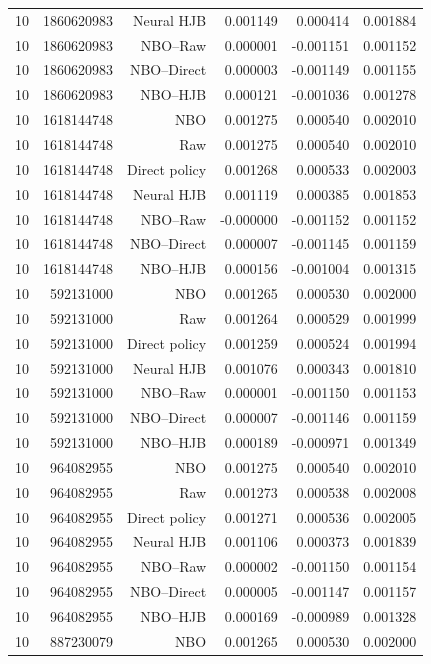 \begin{longtable}{lrrrrr}
10 & 1860620983 & Neural HJB & 0.001149 & 0.000414 & 0.001884 \\
10 & 1860620983 & NBO--Raw & 0.000001 & -0.001151 & 0.001152 \\
10 & 1860620983 & NBO--Direct & 0.000003 & -0.001149 & 0.001155 \\
10 & 1860620983 & NBO--HJB & 0.000121 & -0.001036 & 0.001278 \\
10 & 1618144748 & NBO & 0.001275 & 0.000540 & 0.002010 \\
10 & 1618144748 & Raw & 0.001275 & 0.000540 & 0.002010 \\
10 & 1618144748 & Direct policy & 0.001268 & 0.000533 & 0.002003 \\
10 & 1618144748 & Neural HJB & 0.001119 & 0.000385 & 0.001853 \\
10 & 1618144748 & NBO--Raw & -0.000000 & -0.001152 & 0.001152 \\
10 & 1618144748 & NBO--Direct & 0.000007 & -0.001145 & 0.001159 \\
10 & 1618144748 & NBO--HJB & 0.000156 & -0.001004 & 0.001315 \\
10 & 592131000 & NBO & 0.001265 & 0.000530 & 0.002000 \\
10 & 592131000 & Raw & 0.001264 & 0.000529 & 0.001999 \\
10 & 592131000 & Direct policy & 0.001259 & 0.000524 & 0.001994 \\
10 & 592131000 & Neural HJB & 0.001076 & 0.000343 & 0.001810 \\
10 & 592131000 & NBO--Raw & 0.000001 & -0.001150 & 0.001153 \\
10 & 592131000 & NBO--Direct & 0.000007 & -0.001146 & 0.001159 \\
10 & 592131000 & NBO--HJB & 0.000189 & -0.000971 & 0.001349 \\
10 & 964082955 & NBO & 0.001275 & 0.000540 & 0.002010 \\
10 & 964082955 & Raw & 0.001273 & 0.000538 & 0.002008 \\
10 & 964082955 & Direct policy & 0.001271 & 0.000536 & 0.002005 \\
10 & 964082955 & Neural HJB & 0.001106 & 0.000373 & 0.001839 \\
10 & 964082955 & NBO--Raw & 0.000002 & -0.001150 & 0.001154 \\
10 & 964082955 & NBO--Direct & 0.000005 & -0.001147 & 0.001157 \\
10 & 964082955 & NBO--HJB & 0.000169 & -0.000989 & 0.001328 \\
10 & 887230079 & NBO & 0.001265 & 0.000530 & 0.002000 \\

\end{longtable}
